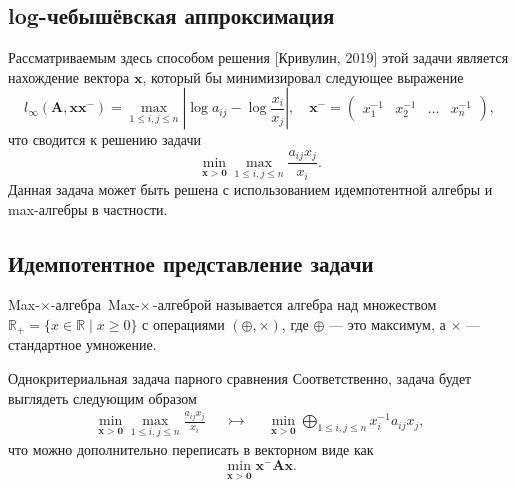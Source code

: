 \documentclass[ucs, notheorems, handout]{beamer}
\begin{document}
\subsection{log-чебышёвская аппроксимация}
\begin{frame}
	Рассматриваемым здесь способом решения [Кривулин, 2019] этой задачи является нахождение вектора $\mathbf{x}$, который бы минимизировал следующее выражение
	\[
	l_{\infty}\left(\mathbf{A}, \mathbf{x} \mathbf{x}^{-}\right)=\max _{1 \leq i, j \leq n}\left|\log a_{i j}-\log \frac{x_{i}}{x_{j}}\right|, \quad \mathbf{x}^{-} = \begin{pmatrix}x_1^{-1}&x_2^{-1} & \dots & x_n^{-1}\end{pmatrix},
	\]
	что сводится к решению задачи
	\[
	\min _{\mathbf{x}>\mathbf{0}} \max _{1 \leq i, j \leq n} \frac{a_{i j} x_{j}}{x_{i}}.
	\]
	Данная задача может быть решена с использованием идемпотентной алгебры и max-алгебры в частности.
\end{frame}

\subsection{Идемпотентное представление задачи}
\begin{frame}
	 \begin{block}{Max-$\times$-алгебра}
		$\text{Max-}\times$-алгеброй называется алгебра над множеством $\mathbb{R}_{+}=\{x \in \mathbb{R} \mid x \geq 0\}$ с операциями ${(\oplus, \times)}$, где $\oplus$ --- это максимум, а $\times$ --- стандартное умножение.
	\end{block}
	
	\begin{block}{Однокритериальная задача парного сравнения}
		Соответственно, задача будет выглядеть следующим образом
		\begin{align*}
		\min _{\mathbf{x}>\mathbf{0}} \max _{1 \leq i, j \leq n} \frac{a_{i j} x_{j}}{x_{i}} && \rightarrowtail &&
		\min _{\mathbf{x}>\mathbf{0}} \bigoplus_{1 \leq i, j \leq n} x_{i}^{-1} a_{i j} x_{j},
		\end{align*}
		что можно дополнительно переписать в векторном виде как
		\[
		\min _{\mathbf{x}>\mathbf{0}} \mathbf{x}^{-} \mathbf{A} \mathbf{x}.
		\]
	\end{block}

\end{frame}
\end{document}
